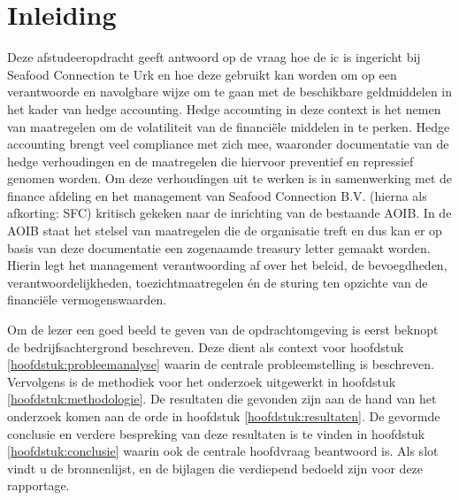 \chapter*{Inleiding} %
Deze afstudeeropdracht geeft antwoord op de vraag hoe de \gls{ic} is ingericht bij Seafood Connection te Urk en hoe deze gebruikt kan worden om op een verantwoorde en navolgbare wijze om te gaan met de beschikbare geldmiddelen in het kader van hedge accounting. Hedge accounting in deze context is het nemen van maatregelen om de volatiliteit van de financiële middelen in te perken. Hedge accounting brengt veel compliance met zich mee, waaronder documentatie van de hedge verhoudingen en de maatregelen die hiervoor preventief en repressief genomen worden. Om deze verhoudingen uit te werken is in samenwerking met de finance afdeling en het management van Seafood Connection B.V. (hierna als afkorting: SFC) kritisch gekeken naar de inrichting van de bestaande AOIB. In de AOIB staat het stelsel van maatregelen die de organisatie treft en dus kan er op basis van deze documentatie een zogenaamde treasury letter gemaakt worden. Hierin legt het management  verantwoording af over het beleid, de bevoegdheden, verantwoordelijkheden, toezichtmaatregelen én de sturing ten opzichte van de financiële vermogenswaarden.

Om de lezer een goed beeld te geven van de opdrachtomgeving is eerst beknopt de bedrijfsachtergrond beschreven. 
Deze dient als context voor hoofdstuk \ref{hoofdstuk:probleemanalyse} waarin de centrale probleemstelling is beschreven. Vervolgens is de methodiek voor het onderzoek uitgewerkt in hoofdstuk \ref{hoofdstuk:methodologie}. De resultaten die gevonden zijn aan de hand van het onderzoek komen aan de orde in hoofdstuk \ref{hoofdstuk:resultaten}. De gevormde conclusie en verdere bespreking van deze resultaten is te vinden in hoofdstuk \ref{hoofdstuk:conclusie} waarin ook de centrale hoofdvraag beantwoord is. Als slot vindt u de bronnenlijst, en de bijlagen die verdiepend bedoeld zijn voor deze rapportage. 

\vfill
\begin{center}
\end{center}